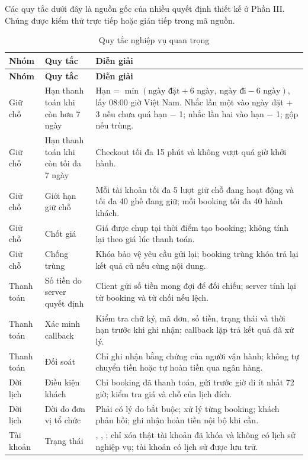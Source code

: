 Các quy tắc dưới đây là nguồn gốc của nhiều quyết định thiết kế ở Phần III. Chúng được kiểm thử trực tiếp hoặc gián tiếp trong mã nguồn.

\begin{longtable}{@{}L{3.2cm}L{5.4cm}L{6.3cm}@{}}
\caption{Quy tắc nghiệp vụ quan trọng}
\label{tab:quy-tac}\\
\toprule
\textbf{Nhóm} & \textbf{Quy tắc} & \textbf{Diễn giải}\\
\midrule
\endfirsthead
\toprule
\textbf{Nhóm} & \textbf{Quy tắc} & \textbf{Diễn giải}\\
\midrule
\endhead
\bottomrule
\endfoot
Giữ chỗ & Hạn thanh toán khi còn hơn 7 ngày & Hạn = \(\min(\text{ngày đặt}+6\text{ ngày},\ \text{ngày đi}-6\text{ ngày})\), lấy 08:00 giờ Việt Nam. Nhắc lần một vào ngày đặt + 3 nếu chưa quá hạn − 1; nhắc lần hai vào hạn − 1; gộp nếu trùng.\\
Giữ chỗ & Hạn thanh toán khi còn tối đa 7 ngày & Checkout tối đa 15 phút và không vượt quá giờ khởi hành.\\
Giữ chỗ & Giới hạn giữ chỗ & Mỗi tài khoản tối đa 5 lượt giữ chỗ đang hoạt động và tối đa 40 ghế đang giữ; mỗi booking tối đa 40 hành khách.\\
Giữ chỗ & Chốt giá & Giá được chụp tại thời điểm tạo booking; không tính lại theo giá lúc thanh toán.\\
Giữ chỗ & Chống trùng & Khóa  bảo vệ yêu cầu gửi lại; booking trùng khóa trả lại kết quả cũ nếu cùng nội dung.\\
Thanh toán & Số tiền do server quyết định & Client gửi số tiền mong đợi để đối chiếu; server tính lại từ booking và từ chối nếu lệch.\\
Thanh toán & Xác minh callback & Kiểm tra chữ ký, mã đơn, số tiền, trạng thái và thời hạn trước khi ghi nhận; callback lặp trả kết quả đã xử lý.\\
Thanh toán & Đối soát & Chỉ ghi nhận bằng chứng của người vận hành; không tự chuyển tiền hoặc tự hoàn tiền qua ngân hàng.\\
Dời lịch & Điều kiện khách & Chỉ booking đã thanh toán, gửi trước giờ đi ít nhất 72 giờ; kiểm tra giá và chỗ của lịch đích.\\
Dời lịch & Dời do đơn vị tổ chức & Phải có lý do bắt buộc; xử lý từng booking; khách phản hồi; ghi nhận hoàn tiền nội bộ khi cần.\\
Tài khoản & Trạng thái & , , ; chỉ xóa thật tài khoản đã khóa và không có lịch sử nghiệp vụ; tài khoản có lịch sử được lưu trữ.\\

\end{longtable}
